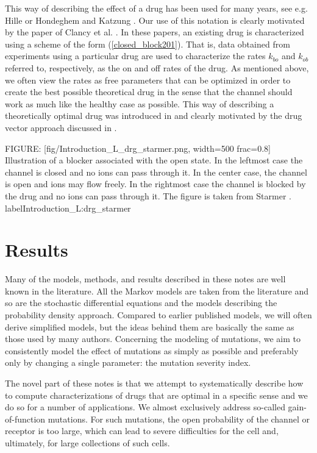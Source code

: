 This way of describing the effect of a drug has been used for many years, see e.g. Hille \cite{Hille1977} or Hondeghem and Katzung \cite{Hondeghem1977}. Our use of this notation is clearly motivated by the paper of Clancy et al. \cite{Clancy2007}. In these papers, an existing drug is characterized using a scheme of the form (\ref{closed_block201}). That is, data obtained from experiments using a particular drug are used to characterize the rates $k_{bo}$ and $k_{ob}$ referred to, respectively, as the on and off rates of the drug. As mentioned above, we often view the rates as free parameters that can be optimized in order to create the best possible theoretical drug in the sense that the channel should work as much like the healthy case as possible. This way of describing a theoretically optimal drug was introduced in \cite{Tveito2011c} and clearly motivated by the drug vector approach discussed in   \cite{Tveito2009}.

FIGURE: [fig/Introduction_L_drg_starmer.png, width=500 frac=0.8] Illustration of a blocker associated with the open state. In the leftmost case the channel is closed and no ions can pass through it. In the center case, the channel is open and ions may flow freely. In the rightmost case the channel is blocked by the drug and no ions can pass through it. The figure is taken from Starmer \cite{Starmer2002}. label{Introduction_L:drg_starmer}

\section{Results}
Many of the models, methods, and results described in these notes are well known in the literature. All the Markov models are taken from the literature and so are the stochastic differential equations and the models describing the probability density approach. Compared to earlier published models, we will often derive simplified models, but the ideas behind them are basically the same as those used by many authors. Concerning the modeling of mutations, we aim to consistently model the effect of mutations as simply as possible and preferably only by changing a single parameter: the mutation severity index.

The novel part of these notes is that we attempt to systematically describe how to compute characterizations of drugs that are optimal in a specific sense and we do so for a number of applications. We almost exclusively address so-called gain-of-function mutations. For such mutations, the open probability of the channel or receptor is too large, which can lead to severe difficulties for the cell and, ultimately, for large collections of such cells.

